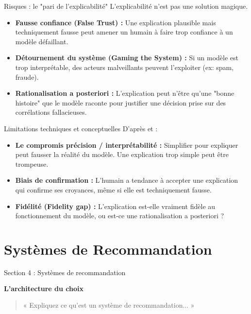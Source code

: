 \documentclass[9pt, aspectratio=169]{beamer}
\begin{document}
\begin{frame}{Risques : le "pari de l'explicabilité"}
    L'explicabilité n'est pas une solution magique.
    \begin{itemize}
        \item \textbf{Fausse confiance (False Trust) :} Une explication plausible mais techniquement fausse peut amener un humain à faire trop confiance à un modèle défaillant.
        \item \textbf{Détournement du système (Gaming the System) :} Si un modèle est trop interprétable, des acteurs malveillants peuvent l'exploiter (ex: spam, fraude).
        \item \textbf{Rationalisation a posteriori :} L'explication peut n'être qu'une "bonne histoire" que le modèle raconte pour justifier une décision prise sur des corrélations fallacieuses.
    \end{itemize}
\end{frame}

\begin{frame}{Limitations techniques et conceptuelles}
    D'après \textcite{Doran2002What} et \textcite{Burkart2021A} :
    \begin{itemize}
        \item \textbf{Le compromis précision / interprétabilité :} Simplifier pour expliquer peut fausser la réalité du modèle. Une explication trop simple peut être trompeuse.
        \item \textbf{Biais de confirmation :} L'humain a tendance à accepter une explication qui confirme ses croyances, même si elle est techniquement fausse.
        \item \textbf{Fidélité (Fidelity gap) :} L'explication est-elle vraiment fidèle au fonctionnement du modèle, ou est-ce une rationalisation a posteriori ?
    \end{itemize}
\end{frame}

\section{Systèmes de Recommandation}

\begin{frame}{Section 4 : Systèmes de recommandation}
    \begin{center}
        \Large \textbf{L'architecture du choix}
    \end{center}
    \vspace{1cm}
    \begin{quote}
        « Expliquez ce qu'est un système de recommandation... »
    \end{quote}
\end{frame}
\end{document}
